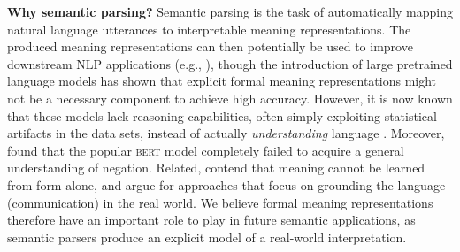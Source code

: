 \documentclass[11pt,a4paper]{article}
\newcommand{\bert}{\textsc{bert}}
\newcommand{\inlineheadernoquad}[1]{\vspace{0.06cm}
\noindent\textbf{#1}
}
\begin{document}
\inlineheadernoquad{Why semantic parsing?} Semantic parsing is the task of automatically mapping natural language utterances to interpretable meaning representations. The produced meaning representations can then potentially be used to improve downstream NLP applications (e.g., \citealp{issa-etal-2018-abstract,song-etal-2019-semantic, mihaylov-frank-2019-discourse}), though the introduction of large pretrained language models has shown that explicit formal meaning representations might not be a necessary component to achieve high accuracy. However, it is now known that these models lack reasoning capabilities, often simply exploiting statistical artifacts in the data sets, instead of actually \textit{understanding} language \citep{niven-kao-2019-probing, mccoy-etal-2019-right}. Moreover, \citet{ettinger2020bert} found that the popular \bert{} model \citep{bert:19} completely failed to acquire a general understanding of negation. Related, \citet{bender-koller-2020-climbing} contend that meaning cannot be learned from form alone, and argue for approaches that focus on grounding the language (communication) in the real world. We believe formal meaning representations therefore have an important role to play in future semantic applications, as semantic parsers produce an explicit model of a real-world interpretation.
\end{document}
